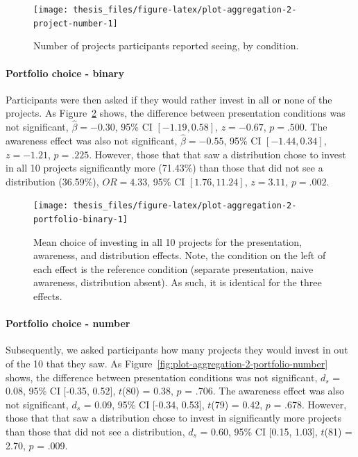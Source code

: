 \documentclass[a4paper, nobind, dvipsnames]{templates/ociamthesis}
\theoremstyle{definition}
\theoremstyle{definition}
\theoremstyle{definition}
\theoremstyle{definition}
\theoremstyle{remark}
\begin{document}
\begin{figure}
\texttt{[image: thesis\_files/figure-latex/plot-aggregation-2-project-number-1]} \caption{Number of projects participants reported seeing, by condition.}\label{fig:plot-aggregation-2-project-number}
\end{figure}

\paragraph{Portfolio choice - binary}

Participants were then asked if they would rather invest in all or none of the
projects. As Figure~\ref{fig:plot-aggregation-2-portfolio-binary} shows, the
difference between presentation conditions was not significant,
\(\hat{\beta} = -0.30\), 95\% CI \([-1.19, 0.58]\), \(z = -0.67\), \(p = .500\). The
awareness effect was also not significant,
\(\hat{\beta} = -0.55\), 95\% CI \([-1.44, 0.34]\), \(z = -1.21\), \(p = .225\). However,
those that that saw a distribution chose to invest in all 10 projects
significantly more
(71.43\%) than
those that did not see a distribution
(36.59\%),
\(OR = 4.33\), 95\% CI \([1.76, 11.24]\), \(z = 3.11\), \(p = .002\).



\begin{figure}
\texttt{[image: thesis\_files/figure-latex/plot-aggregation-2-portfolio-binary-1]} \caption{Mean choice of investing in all 10 projects for the presentation, awareness, and distribution effects. Note, the condition on the left of each effect is the reference condition (separate presentation, naive awareness, distribution absent). As such, it is identical for the three effects.}\label{fig:plot-aggregation-2-portfolio-binary}
\end{figure}

\paragraph{Portfolio choice - number}

Subsequently, we asked participants how many projects they would invest in out
of the 10 that they saw. As
Figure~\ref{fig:plot-aggregation-2-portfolio-number} shows, the difference
between presentation conditions was not significant,
\(d_s\) = 0.08, 95\% CI {[}-0.35, 0.52{]}, \(t\)(80) = 0.38, \(p\) = .706. The awareness effect
was also not significant, \(d_s\) = 0.09, 95\% CI {[}-0.34, 0.53{]}, \(t\)(79) = 0.42, \(p\) = .678.
However, those that that saw a distribution chose to invest in significantly
more projects than those that did not see a distribution,
\(d_s\) = 0.60, 95\% CI {[}0.15, 1.03{]}, \(t\)(81) = 2.70, \(p\) = .009.
\end{document}
